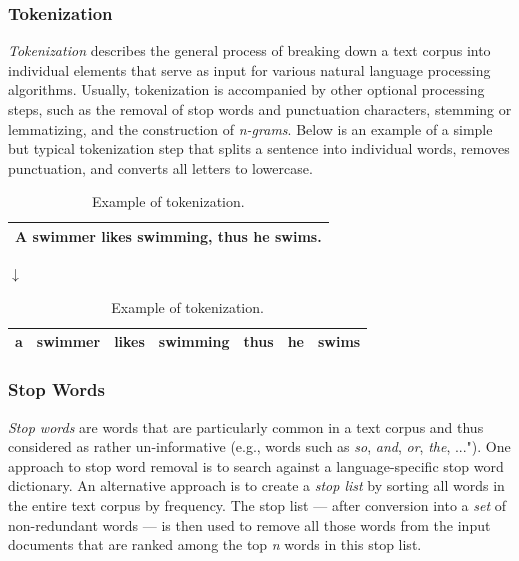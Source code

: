 \documentclass{article}
\begin{document}
\subsubsection{Tokenization}
\label{sec:tokenization} 

\emph{Tokenization} describes the general process of breaking down a text corpus into individual elements that serve as input for various natural language processing algorithms. Usually, tokenization is accompanied by other optional processing steps, such as the removal of stop words and punctuation characters, stemming or lemmatizing, and the construction of \emph{n-grams}. Below is an example of a simple but typical tokenization step that splits a sentence into individual words, removes punctuation, and converts all letters to lowercase.


\begin{table}[H]
\caption{Example of tokenization.}
\begin{center}
\begin{tabular}{ | c | }

\hline
A swimmer likes swimming, thus he swims. \\ \hline
\end{tabular}

$\downarrow$

\begin{tabular}{ | c | c | c |  c | c | c | c |}
\hline
a & swimmer & likes & swimming & thus & he & swims \\ \hline
\end{tabular}
\end{center}

\end{table}




\subsubsection{Stop Words}
\label{sec:stopwords}

\emph{Stop words} are words that are particularly common in a text corpus and thus considered as rather un-informative (e.g., words such as \emph{so}, \emph{and}, \emph{or}, \emph{the}, ..."). One approach to stop word removal is to search against a language-specific stop word dictionary. An alternative approach is to create a  \emph{stop list} by sorting all words in the entire text corpus by frequency. The stop list --- after conversion into a \emph{set} of non-redundant words --- is then used to remove all those words from the input documents that are ranked among the top \emph{n} words in this stop list.
\end{document}

